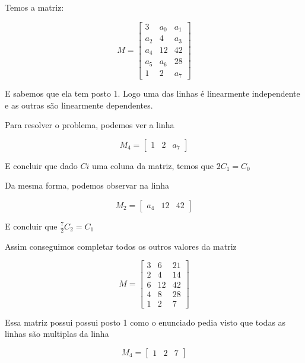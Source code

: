 \documentclass[11pt]{article}
\begin{document}
\begin{exerc}
\begin{enumerate}

Temos a matriz:

\[
M = 
\begin{bmatrix}
    3 & a_0 & a_1 \\
    a_2 & 4 & a_3 \\
    a_4 & 12 & 42 \\
    a_5 & a_6 & 28 \\
    1 & 2 & a_7
\end{bmatrix}
\]

E sabemos que ela tem posto 1. Logo uma das linhas é linearmente independente e as outras são linearmente dependentes.

Para resolver o problema, podemos ver a linha

\[
M_{4} = 
\begin{bmatrix}
    1 & 2 & a_7
\end{bmatrix}
\]

E concluir que dado $C{i}$ uma coluna da matriz, temos que $2 C_{1} = C_{0}$

Da mesma forma, podemos observar na linha

\[
M_{2} = 
\begin{bmatrix}
    a_4 & 12 & 42
\end{bmatrix}
\]

E concluir que $\frac{7}{2} C_{2} = C_{1}$

Assim conseguimos completar todos os outros valores da matriz

\[
M = 
\begin{bmatrix}
    3 & 6 & 21 \\
    2 & 4 & 14 \\
    6 & 12 & 42 \\
    4 & 8 & 28 \\
    1 & 2 & 7
\end{bmatrix}
\]

Essa matriz possui possui posto 1 como o enunciado pedia visto que todas as linhas são multiplas da linha

\[
M_{4} = 
\begin{bmatrix}
    1 & 2 & 7
\end{bmatrix}
\]

\end{enumerate}
\end{exerc}

\newpage
\end{document}
